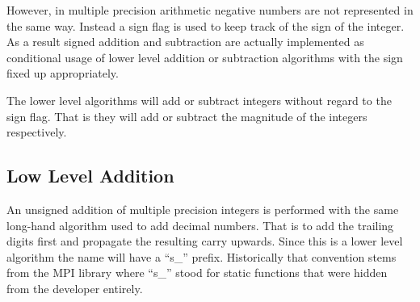 \documentclass[b5paper]{book}
\begin{document}
However, in multiple precision arithmetic negative numbers are not represented in the same way.  Instead a sign flag is used to keep track of the
sign of the integer.  As a result signed addition and subtraction are actually implemented as conditional usage of lower level addition or 
subtraction algorithms with the sign fixed up appropriately.

The lower level algorithms will add or subtract integers without regard to the sign flag.  That is they will add or subtract the magnitude of
the integers respectively.

\subsection{Low Level Addition}
An unsigned addition of multiple precision integers is performed with the same long-hand algorithm used to add decimal numbers.  That is to add the 
trailing digits first and propagate the resulting carry upwards.  Since this is a lower level algorithm the name will have a ``s\_'' prefix.  
Historically that convention stems from the MPI library where ``s\_'' stood for static functions that were hidden from the developer entirely.
\end{document}
